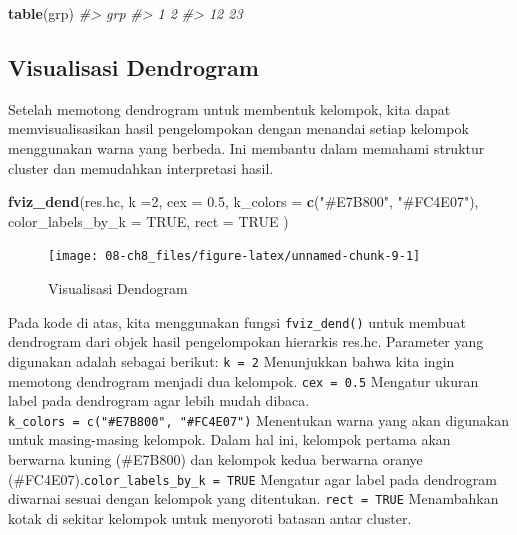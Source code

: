 \documentclass[
  oneside]{book}
\newenvironment{Shaded}{\begin{snugshade}}{\end{snugshade}}
\newcommand{\AttributeTok}[1]{\textcolor[rgb]{0.13,0.29,0.53}{#1}}
\newcommand{\CommentTok}[1]{\textcolor[rgb]{0.56,0.35,0.01}{\textit{#1}}}
\newcommand{\ConstantTok}[1]{\textcolor[rgb]{0.56,0.35,0.01}{#1}}
\newcommand{\DecValTok}[1]{\textcolor[rgb]{0.00,0.00,0.81}{#1}}
\newcommand{\FloatTok}[1]{\textcolor[rgb]{0.00,0.00,0.81}{#1}}
\newcommand{\FunctionTok}[1]{\textcolor[rgb]{0.13,0.29,0.53}{\textbf{#1}}}
\newcommand{\NormalTok}[1]{#1}
\newcommand{\StringTok}[1]{\textcolor[rgb]{0.31,0.60,0.02}{#1}}
\begin{document}
\begin{Shaded}
\begin{Highlighting}[]
\FunctionTok{table}\NormalTok{(grp)}
\CommentTok{\#\textgreater{} grp}
\CommentTok{\#\textgreater{}  1  2 }
\CommentTok{\#\textgreater{} 12 23}
\end{Highlighting}
\end{Shaded}

\subsection*{Visualisasi Dendrogram}\label{visualisasi-dendrogram}

Setelah memotong dendrogram untuk membentuk kelompok, kita dapat memvisualisasikan hasil pengelompokan dengan menandai setiap kelompok menggunakan warna yang berbeda. Ini membantu dalam memahami struktur cluster dan memudahkan interpretasi hasil.

\begin{Shaded}
\begin{Highlighting}[]
\FunctionTok{fviz\_dend}\NormalTok{(res.hc, }\AttributeTok{k =}\DecValTok{2}\NormalTok{, }
          \AttributeTok{cex =} \FloatTok{0.5}\NormalTok{, }
          \AttributeTok{k\_colors =} \FunctionTok{c}\NormalTok{(}\StringTok{"\#E7B800"}\NormalTok{, }\StringTok{"\#FC4E07"}\NormalTok{),}
          \AttributeTok{color\_labels\_by\_k =} \ConstantTok{TRUE}\NormalTok{, }
          \AttributeTok{rect =} \ConstantTok{TRUE} 
\NormalTok{          )}
\end{Highlighting}
\end{Shaded}

\begin{figure}[h]

{\centering \texttt{[image: 08-ch8\_files/figure-latex/unnamed-chunk-9-1]} 

}

\caption{Visualisasi Dendogram}\label{fig:unnamed-chunk-9}
\end{figure}

Pada kode di atas, kita menggunakan fungsi \texttt{fviz\_dend()} untuk membuat dendrogram dari objek hasil pengelompokan hierarkis res.hc. Parameter yang digunakan adalah sebagai berikut: \texttt{k\ =\ 2} Menunjukkan bahwa kita ingin memotong dendrogram menjadi dua kelompok. \texttt{cex\ =\ 0.5} Mengatur ukuran label pada dendrogram agar lebih mudah dibaca. \texttt{k\_colors\ =\ c("\#E7B800",\ "\#FC4E07")} Menentukan warna yang akan digunakan untuk masing-masing kelompok. Dalam hal ini, kelompok pertama akan berwarna kuning (\#E7B800) dan kelompok kedua berwarna oranye (\#FC4E07).\texttt{color\_labels\_by\_k\ =\ TRUE} Mengatur agar label pada dendrogram diwarnai sesuai dengan kelompok yang ditentukan. \texttt{rect\ =\ TRUE} Menambahkan kotak di sekitar kelompok untuk menyoroti batasan antar cluster.
\end{document}
